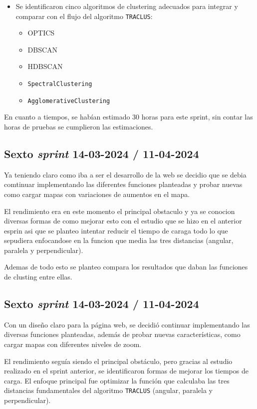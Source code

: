 \begin{itemize}
    \item Se identificaron cinco algoritmos de clustering adecuados para integrar y comparar con el flujo del algoritmo \texttt{TRACLUS}:
        \begin{itemize}
            \item OPTICS
            \item DBSCAN
            \item HDBSCAN
            \item \texttt{SpectralClustering}
            \item \texttt{AgglomerativeClustering}
        \end{itemize}
\end{itemize}

En cuanto a tiempos, se habían estimado 30 horas para este sprint, sin contar las horas de pruebas se cumplieron las estimaciones.

\subsection{Sexto \textit{sprint} 14-03-2024 / 11-04-2024}

Ya teniendo claro como iba a ser el desarrollo de la web se decidio que se debia comtinuar implementando las diferentes funciones planteadas y probar nuevas como cargar mapas con variaciones de aumentos en el mapa.

El rendimiento era en este momento el principal obstaculo y ya se conocion diversas formas de como mejorar esto con el estudio que se hizo en el anterior esprin asi que se planteo intentar reducir el tiempo de caraga todo lo que sepudiera enfocandose en la funcion que media las tres distancias (angular, paralela y perpendicular).

Ademas de todo esto se planteo compara los resultados que daban las funciones de clusting entre ellas.

\subsection{Sexto \textit{sprint} 14-03-2024 / 11-04-2024}

Con un diseño claro para la página web, se decidió continuar implementando las diversas funciones planteadas, además de probar nuevas características, como cargar mapas con diferentes niveles de zoom.

El rendimiento seguía siendo el principal obstáculo, pero gracias al estudio realizado en el sprint anterior, se identificaron formas de mejorar los tiempos de carga. El enfoque principal fue optimizar la función que calculaba las tres distancias fundamentales del algoritmo \texttt{TRACLUS} (angular, paralela y perpendicular).

